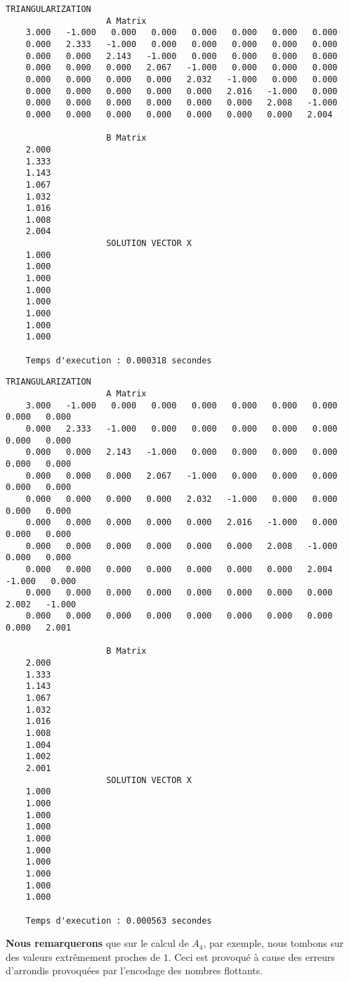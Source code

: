 \begin{lstlisting}[caption={$A_{11}X=B$} results, basicstyle=\fontsize{5}{8}\selectfont]
					TRIANGULARIZATION 
					A Matrix 
	3.000   -1.000   0.000   0.000   0.000   0.000   0.000   0.000   
	0.000   2.333   -1.000   0.000   0.000   0.000   0.000   0.000   
	0.000   0.000   2.143   -1.000   0.000   0.000   0.000   0.000   
	0.000   0.000   0.000   2.067   -1.000   0.000   0.000   0.000   
	0.000   0.000   0.000   0.000   2.032   -1.000   0.000   0.000   
	0.000   0.000   0.000   0.000   0.000   2.016   -1.000   0.000   
	0.000   0.000   0.000   0.000   0.000   0.000   2.008   -1.000   
	0.000   0.000   0.000   0.000   0.000   0.000   0.000   2.004   
	
					B Matrix 
	2.000   
	1.333   
	1.143   
	1.067   
	1.032   
	1.016   
	1.008   
	2.004   
					SOLUTION VECTOR X 
	1.000   
	1.000   
	1.000   
	1.000   
	1.000   
	1.000   
	1.000   
	1.000   
	
	Temps d'execution : 0.000318 secondes
\end{lstlisting}
\begin{lstlisting}[caption={$A_{12}=B$} results, basicstyle=\fontsize{5}{8}\selectfont]
					TRIANGULARIZATION 
					A Matrix 
	3.000   -1.000   0.000   0.000   0.000   0.000   0.000   0.000   0.000   0.000   
	0.000   2.333   -1.000   0.000   0.000   0.000   0.000   0.000   0.000   0.000   
	0.000   0.000   2.143   -1.000   0.000   0.000   0.000   0.000   0.000   0.000   
	0.000   0.000   0.000   2.067   -1.000   0.000   0.000   0.000   0.000   0.000   
	0.000   0.000   0.000   0.000   2.032   -1.000   0.000   0.000   0.000   0.000   
	0.000   0.000   0.000   0.000   0.000   2.016   -1.000   0.000   0.000   0.000   
	0.000   0.000   0.000   0.000   0.000   0.000   2.008   -1.000   0.000   0.000   
	0.000   0.000   0.000   0.000   0.000   0.000   0.000   2.004   -1.000   0.000   
	0.000   0.000   0.000   0.000   0.000   0.000   0.000   0.000   2.002   -1.000   
	0.000   0.000   0.000   0.000   0.000   0.000   0.000   0.000   0.000   2.001   
	
					B Matrix 
	2.000   
	1.333   
	1.143   
	1.067   
	1.032   
	1.016   
	1.008   
	1.004   
	1.002   
	2.001   
					SOLUTION VECTOR X 
	1.000   
	1.000   
	1.000   
	1.000   
	1.000   
	1.000   
	1.000   
	1.000   
	1.000   
	1.000   
	
	Temps d'execution : 0.000563 secondes
\end{lstlisting}

\textbf{Nous remarquerons} que sur le calcul de $A_4$, par exemple, nous tombons sur des valeurs extrêmement proches de $1$. Ceci est provoqué à cause des erreurs d'arrondis provoquées par l'encodage des nombres flottants.     